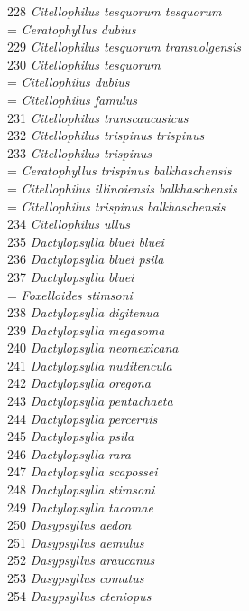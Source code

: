 \documentclass[
]{article}
\begin{document}
228 \emph{Citellophilus tesquorum tesquorum}\\
= \emph{Ceratophyllus dubius}\\
229 \emph{Citellophilus tesquorum transvolgensis}\\
230 \emph{Citellophilus tesquorum}\\
= \emph{Citellophilus dubius}\\
= \emph{Citellophilus famulus}\\
231 \emph{Citellophilus transcaucasicus}\\
232 \emph{Citellophilus trispinus trispinus}\\
233 \emph{Citellophilus trispinus}\\
= \emph{Ceratophyllus trispinus balkhaschensis}\\
= \emph{Citellophilus illinoiensis balkhaschensis}\\
= \emph{Citellophilus trispinus balkhaschensis}\\
234 \emph{Citellophilus ullus}\\
235 \emph{Dactylopsylla bluei bluei}\\
236 \emph{Dactylopsylla bluei psila}\\
237 \emph{Dactylopsylla bluei}\\
= \emph{Foxelloides stimsoni}\\
238 \emph{Dactylopsylla digitenua}\\
239 \emph{Dactylopsylla megasoma}\\
240 \emph{Dactylopsylla neomexicana}\\
241 \emph{Dactylopsylla nuditencula}\\
242 \emph{Dactylopsylla oregona}\\
243 \emph{Dactylopsylla pentachaeta}\\
244 \emph{Dactylopsylla percernis}\\
245 \emph{Dactylopsylla psila}\\
246 \emph{Dactylopsylla rara}\\
247 \emph{Dactylopsylla scapossei}\\
248 \emph{Dactylopsylla stimsoni}\\
249 \emph{Dactylopsylla tacomae}\\
250 \emph{Dasypsyllus aedon}\\
251 \emph{Dasypsyllus aemulus}\\
252 \emph{Dasypsyllus araucanus}\\
253 \emph{Dasypsyllus comatus}\\
254 \emph{Dasypsyllus cteniopus}\\
\end{document}
